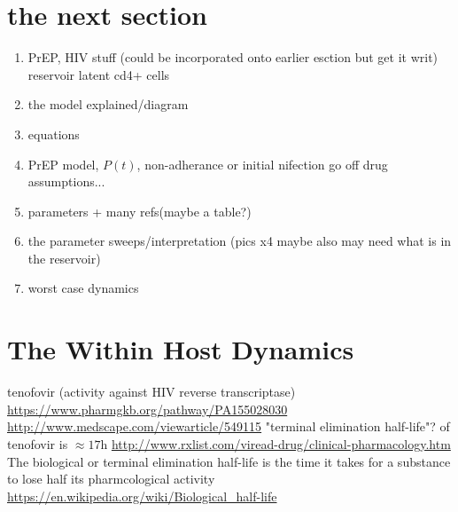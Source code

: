 \documentclass[DIV=15]{scrartcl}
\begin{document}
\section{the next section}
\begin{enumerate}
\item PrEP, HIV stuff (could be incorporated onto earlier esction but get it writ) reservoir latent cd4+ cells
\item the model explained/diagram
\item equations 
\item PrEP model, $P(t)$, non-adherance or initial nifection go off drug assumptions...
\item parameters + many refs(maybe a table?)
\item the parameter sweeps/interpretation (pics x4 maybe also may need what is in the reservoir)
\item worst case dynamics


\end{enumerate}
\fi

\section{The Within Host Dynamics}
\label{The Within Host Dynamics}






  




tenofovir (activity against HIV reverse transcriptase) \url{https://www.pharmgkb.org/pathway/PA155028030}
\url{http://www.medscape.com/viewarticle/549115}
"terminal elimination half-life"? of tenofovir is $\approx 17$h
\url{http://www.rxlist.com/viread-drug/clinical-pharmacology.htm}
The biological or terminal elimination half-life is the time it takes for a substance to lose half its pharmcological activity
\url{https://en.wikipedia.org/wiki/Biological_half-life}
\end{document}
